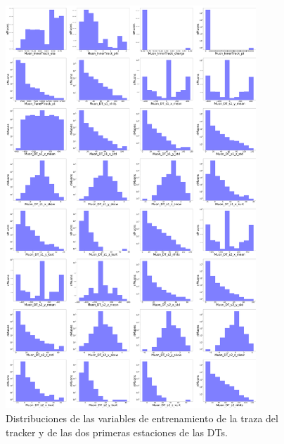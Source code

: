 \begin{figure}[h!]
\centering
\includegraphics[width=0.84\textwidth]{figures/Training_vars_2.png}
\caption{Distribuciones de las variables de entrenamiento de la traza del tracker y de las dos primeras estaciones de las DTs.}
\label{fig:train_vars}        
\end{figure}


\clearpage
